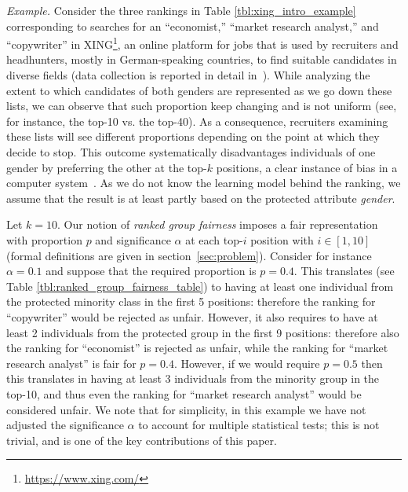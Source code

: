 \medskip
\textit{Example.} Consider the three rankings in Table \ref{tbl:xing_intro_example} corresponding to searches for an ``economist,'' ``market research analyst,'' and ``copywriter'' in XING\footnote{\url{https://www.xing.com/}}, an online platform for jobs that is used by recruiters and headhunters, mostly in German-speaking countries, to find suitable candidates in diverse fields (data collection is reported in detail in~\cite{zehlike2017fair}). While analyzing  the extent to which candidates of both genders are represented as we go down these lists,  we can observe that such proportion keep changing and is not uniform (see, for instance, the top-10 vs. the top-40). As a consequence, recruiters examining these lists will see different proportions depending on the point at which they decide to stop.
%
This outcome systematically disadvantages individuals of one gender by preferring the other at the top-$k$ positions, a clear instance of bias in a computer system~\cite{friedman1996bias}. As we do not know the learning model behind the ranking, we assume that the result is at least partly based on the protected attribute \emph{gender}.

Let $k = 10$. Our notion of \textit{ranked group fairness} imposes a fair representation with proportion $p$ and significance $\alpha$ at each top-$i$ position with $i \in [1,10]$ (formal definitions are given in section~\ref{sec:problem}).
Consider for instance $\alpha = 0.1$ and suppose that the required proportion is $p = 0.4$.  This translates (see Table \ref{tbl:ranked_group_fairness_table}) to having at least one individual from the protected minority class in the first 5 positions: therefore the ranking for  ``copywriter'' would be rejected as unfair. However, it also requires to have at least 2 individuals from the protected group in the first 9 positions: therefore also the ranking for ``economist'' is rejected as unfair, while the ranking for ``market research analyst'' is fair for  $p = 0.4$. However, if we would require $p = 0.5$ then this translates in having at least 3 individuals from the minority group in the top-10, and thus even the ranking for ``market research analyst'' would be considered unfair.
%
We note that for simplicity, in this example we have not adjusted the significance $\alpha$ to account for multiple statistical tests; this is not trivial, and is one of the key contributions of this paper.

\medskip

